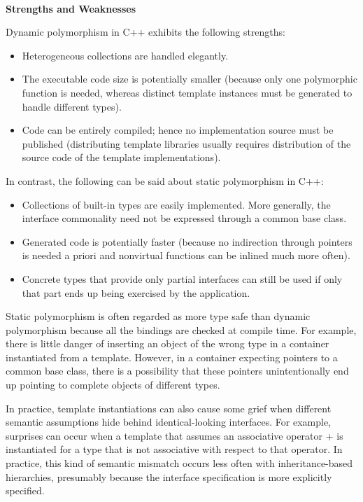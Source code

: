 \hspace*{\fill} \\ %
\noindent
\textbf{Strengths and Weaknesses}

Dynamic polymorphism in C++ exhibits the following strengths:

\begin{itemize}
\item 
Heterogeneous collections are handled elegantly.

\item 
The executable code size is potentially smaller (because only one polymorphic function is needed, whereas distinct template instances must be generated to handle different types).

\item 
Code can be entirely compiled; hence no implementation source must be published (distributing template libraries usually requires distribution of the source code of the template implementations).
\end{itemize}

In contrast, the following can be said about static polymorphism in C++:

\begin{itemize}
\item 
Collections of built-in types are easily implemented. More generally, the interface commonality need not be expressed through a common base class.

\item 
Generated code is potentially faster (because no indirection through pointers is needed a priori and nonvirtual functions can be inlined much more often).

\item 
Concrete types that provide only partial interfaces can still be used if only that part ends up being exercised by the application.
\end{itemize}

Static polymorphism is often regarded as more type safe than dynamic polymorphism because all the bindings are checked at compile time. For example, there is little danger of inserting an object of the wrong type in a container instantiated from a template. However, in a container expecting pointers to a common base class, there is a possibility that these pointers unintentionally end up pointing to complete objects of different types.

In practice, template instantiations can also cause some grief when different semantic assumptions hide behind identical-looking interfaces. For example, surprises can occur when a template that assumes an associative operator + is instantiated for a type that is not associative with respect to that operator. In practice, this kind of semantic mismatch occurs less often with inheritance-based hierarchies, presumably because the interface specification is more explicitly specified.

